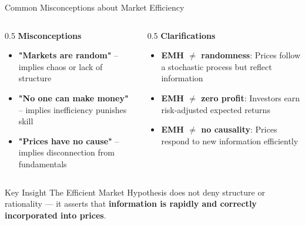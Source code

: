 \begin{frame}{Common Misconceptions about Market Efficiency}
	
	\begin{columns}[T]
		\begin{column}{0.5\textwidth}
			\textbf{Misconceptions}
			\begin{itemize}
				\item \textbf{"Markets are random"} -- implies chaos or lack of structure
				\item \textbf{"No one can make money"} -- implies inefficiency punishes skill
				\item \textbf{"Prices have no cause"} -- implies disconnection from fundamentals
			\end{itemize}
		\end{column}
		
		\begin{column}{0.5\textwidth}
			\textbf{Clarifications}
			\begin{itemize}
				\item \textbf{EMH $\neq$ randomness}: Prices follow a stochastic process but reflect information
				\item \textbf{EMH $\neq$ zero profit}: Investors earn risk-adjusted expected returns
				\item \textbf{EMH $\neq$ no causality}: Prices respond to new information efficiently
			\end{itemize}
		\end{column}
	\end{columns}
	
	\vspace{4mm}
	\begin{block}{Key Insight}
		\small
		The Efficient Market Hypothesis does not deny structure or rationality --- it asserts that \textbf{information is rapidly and correctly incorporated into prices}.
	\end{block}
	
\end{frame}


